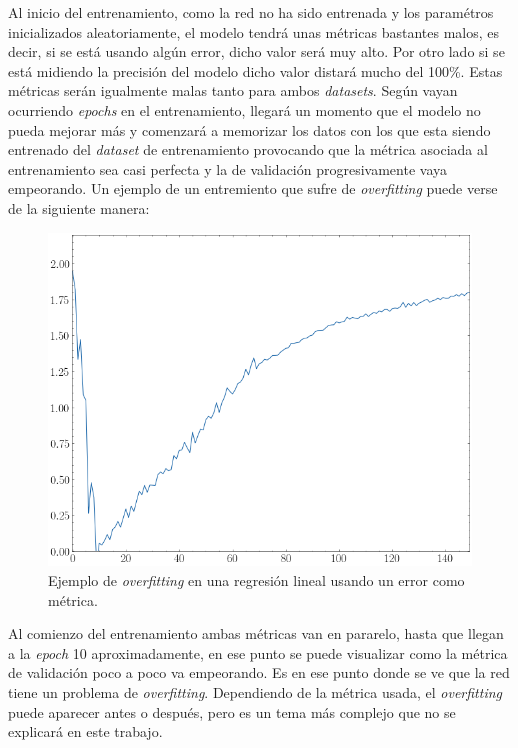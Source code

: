 Al inicio del entrenamiento, como la red no ha sido entrenada y los paramétros inicializados aleatoriamente, el modelo tendrá unas métricas bastantes malos, es decir, si se está usando algún error, dicho valor será muy alto. Por otro lado si se está midiendo la precisión del modelo dicho valor distará mucho del 100\%. Estas métricas serán igualmente malas tanto para ambos \textit{datasets}. Según vayan ocurriendo \textit{epochs} en el entrenamiento, llegará un momento que el modelo no pueda mejorar más y comenzará a memorizar los datos con los que esta siendo entrenado del \textit{dataset} de entrenamiento provocando que la métrica asociada al entrenamiento sea casi perfecta y la de validación progresivamente vaya empeorando. Un ejemplo de un entremiento que sufre de \textit{overfitting} puede verse de la siguiente manera:
\newline

\begin{figure}[H]
    \centering
    \includegraphics[width=12cm]{images/state-of-art/overfitting/overfitting-loss.png}
    \caption{Ejemplo de \textit{overfitting} en una regresión lineal usando un error como métrica.}
    \label{fig:overfitting}
\end{figure}

Al comienzo del entrenamiento ambas métricas van en pararelo, hasta que llegan a la \textit{epoch} 10 aproximadamente, en ese punto se puede visualizar como la métrica de validación poco a poco va empeorando. Es en ese punto donde se ve que la red tiene un problema de \textit{overfitting}. Dependiendo de la métrica usada, el \textit{overfitting} puede aparecer antes o después, pero es un tema más complejo que no se explicará en este trabajo.
\newline

